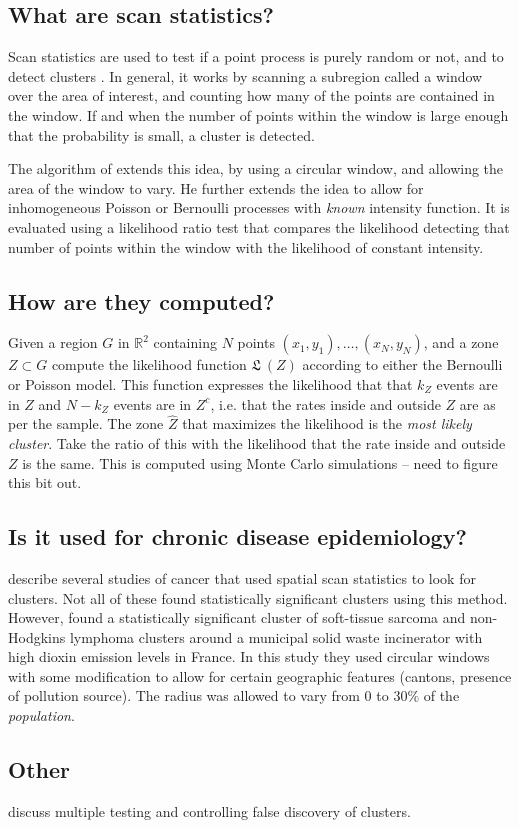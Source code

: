 
\subsection*{What are scan statistics?}

Scan statistics are used to test if a point process is purely random or not, and to detect clusters \citep{naus1965clustering}.
In general, it works by scanning a subregion called a window over the area of interest, and counting how many of the points are contained in the window.
If and when the number of points within the window is large enough that the probability is small, a cluster is detected. \citep{schabenberger2004statistical}

The algorithm of \citep{kulldorff1997spatial} extends this idea, by using a circular window, and allowing the area of the window to vary.
He further extends the idea to allow for inhomogeneous Poisson or Bernoulli processes with \emph{known} intensity function.
It is evaluated using a likelihood ratio test that compares the likelihood detecting that number of points within the window with the likelihood of constant intensity.

\subsection*{How are they computed?}

Given a region $G$ in $\mathbb{R}^2$ containing $N$ points $(x_1,y_1), \ldots, (x_N, y_N)$, and a zone $Z \subset G$ compute the likelihood function $\mathfrak{L}~(Z)$ according to either the Bernoulli or Poisson model.
This function expresses the likelihood that that $k_Z$ events are in $Z$ and $N-k_Z$ events are in $Z^c$, i.e. that the rates inside and outside $Z$ are as per the sample.
The zone $\hat{Z}$ that maximizes the likelihood is the \emph{most likely cluster}.
Take the ratio of this with the likelihood that the rate inside and outside $Z$ is the same.
This is computed using Monte Carlo simulations -- need to figure this bit out.
\citep{schabenberger2004statistical,kulldorff1997spatial}

\subsection*{Is it used for chronic disease epidemiology?}


\citep[Section 6.4]{costa2009applications} describe several studies of cancer that used spatial scan statistics to look for clusters.
Not all of these found statistically significant clusters using this method.
However, \citep{viel2000soft} found a statistically significant cluster of soft-tissue sarcoma and non-Hodgkins lymphoma clusters around a municipal solid waste incinerator with high dioxin emission levels in France.
In this study they used circular windows with some modification to allow for certain geographic features (cantons, presence of pollution source).
The radius was allowed to vary from $0$ to $30\%$ of the \emph{population}.

\subsection*{Other}

\citep{perone2009false} discuss multiple testing and controlling false discovery of clusters.
 

